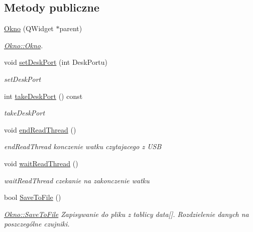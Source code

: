 \subsection*{Metody publiczne}
\begin{DoxyCompactItemize}
\item 
\hyperlink{class_okno_ab0e6342aaa2ff2cd07598a901528efa6}{Okno} (Q\-Widget $\ast$parent)
\begin{DoxyCompactList}\small\item\em \hyperlink{class_okno_ab0e6342aaa2ff2cd07598a901528efa6}{Okno\-::\-Okno}. \end{DoxyCompactList}\item 
void \hyperlink{class_okno_a20d42ba81a2b4b83bed90cb1dc687362}{set\-Desk\-Port} (int Desk\-Portu)
\begin{DoxyCompactList}\small\item\em set\-Desk\-Port \end{DoxyCompactList}\item 
int \hyperlink{class_okno_a3d917a01365c453f29c8f8ff78cd67b7}{take\-Desk\-Port} () const 
\begin{DoxyCompactList}\small\item\em take\-Desk\-Port \end{DoxyCompactList}\item 
\hypertarget{class_okno_acb4f4dd5dfc929b4e019c1c169c9df0c}{void \hyperlink{class_okno_acb4f4dd5dfc929b4e019c1c169c9df0c}{end\-Read\-Thread} ()}\label{class_okno_acb4f4dd5dfc929b4e019c1c169c9df0c}

\begin{DoxyCompactList}\small\item\em end\-Read\-Thread konczenie watku czytajacego z U\-S\-B \end{DoxyCompactList}\item 
\hypertarget{class_okno_a8f6f59862bff738dbf5f650274fb1058}{void \hyperlink{class_okno_a8f6f59862bff738dbf5f650274fb1058}{wait\-Read\-Thread} ()}\label{class_okno_a8f6f59862bff738dbf5f650274fb1058}

\begin{DoxyCompactList}\small\item\em wait\-Read\-Thread czekanie na zakonczenie watku \end{DoxyCompactList}\item 
bool \hyperlink{class_okno_a24f3d0d347964d7da0cde1929ab23c41}{Save\-To\-File} ()
\begin{DoxyCompactList}\small\item\em \hyperlink{class_okno_a24f3d0d347964d7da0cde1929ab23c41}{Okno\-::\-Save\-To\-File} Zapisywanie do pliku z tablicy data\mbox{[}\mbox{]}. Rozdzielenie danych na poszczególne czujniki. \end{DoxyCompactList}\end{DoxyCompactItemize}
